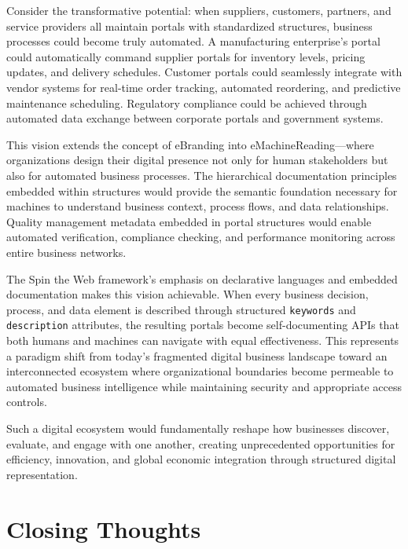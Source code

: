 Consider the transformative potential: when suppliers, customers, partners, and service providers all maintain portals with standardized structures, business processes could become truly automated. A manufacturing enterprise's portal could automatically command supplier portals for inventory levels, pricing updates, and delivery schedules. Customer portals could seamlessly integrate with vendor systems for real-time order tracking, automated reordering, and predictive maintenance scheduling. Regulatory compliance could be achieved through automated data exchange between corporate portals and government systems.

This vision extends the concept of eBranding into eMachineReading—where organizations design their digital presence not only for human stakeholders but also for automated business processes. The hierarchical documentation principles embedded within \wbol{} structures would provide the semantic foundation necessary for machines to understand business context, process flows, and data relationships. Quality management metadata embedded in portal structures would enable automated verification, compliance checking, and performance monitoring across entire business networks.

The Spin the Web framework's emphasis on declarative languages and embedded documentation makes this vision achievable. When every business decision, process, and data element is described through structured \texttt{keywords} and \texttt{description} attributes, the resulting portals become self-documenting APIs that both humans and machines can navigate with equal effectiveness. This represents a paradigm shift from today's fragmented digital business landscape toward an interconnected ecosystem where organizational boundaries become permeable to automated business intelligence while maintaining security and appropriate access controls.

Such a digital ecosystem would fundamentally reshape how businesses discover, evaluate, and engage with one another, creating unprecedented opportunities for efficiency, innovation, and global economic integration through structured digital representation.

\section{Closing Thoughts}


